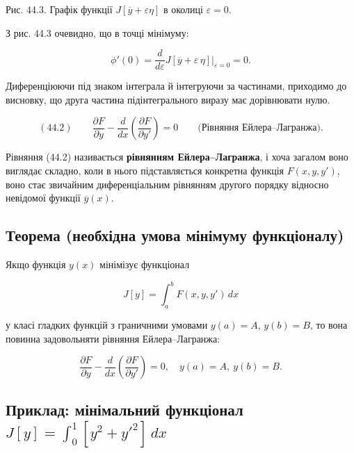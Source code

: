 \documentclass[
  ukrainian,
]{article}
\begin{document}
Рис. 44.3. Графік функції \(J[\overline{y}+\varepsilon\eta]\) в околиці
\(\varepsilon = 0\).

З рис. 44.3 очевидно, що в точці мінімуму:

\[\phi'(0) = \frac{d}{d\varepsilon} J[\overline{y} + \varepsilon\,\eta] \bigg|_{\varepsilon=0} = 0.\]

Диференціюючи під знаком інтеграла й інтегруючи за частинами, приходимо
до висновку, що друга частина підінтегрального виразу має дорівнювати
нулю.

\[(44.2)\qquad\frac{\partial F}{\partial y} - \frac{d}{dx}\!\left(\frac{\partial F}{\partial y'}\right) = 0 \qquad \textbf{(Рівняння Ейлера–Лагранжа)}.\]

Рівняння (44.2) називається \textbf{рівнянням Ейлера--Лагранжа}, і хоча
загалом воно виглядає складно, коли в нього підставляється конкретна
функція \(F(x, y, y')\), воно стає звичайним диференціальним рівнянням
другого порядку відносно невідомої функції \(\overline{y}(x)\).

\subsection{Теорема (необхідна умова мінімуму
функціоналу)}\label{ux442ux435ux43eux440ux435ux43cux430-ux43dux435ux43eux431ux445ux456ux434ux43dux430-ux443ux43cux43eux432ux430-ux43cux456ux43dux456ux43cux443ux43cux443-ux444ux443ux43dux43aux446ux456ux43eux43dux430ux43bux443}

Якщо функція \(y(x)\) мінімізує функціонал

\[J[y] = \int_a^b F(x, y, y')\, dx\]

у класі гладких функцій з граничними умовами \(y(a) = A\), \(y(b) = B\),
то вона повинна задовольняти рівняння Ейлера--Лагранжа:

\[\frac{\partial F}{\partial y} - \frac{d}{dx}\!\left(\frac{\partial F}{\partial y'}\right) = 0, \quad y(a) = A,\ y(b) = B.\]

\subsection{\texorpdfstring{Приклад: мінімальний функціонал
\(J[y] = \int_{0}^{1}[y^2 + y'^2]\,dx\)}{Приклад: мінімальний функціонал J{[}y{]} = \textbackslash int\_\{0\}\^{}\{1\}{[}y\^{}2 + y\textquotesingle\^{}2{]}\textbackslash,dx}}\label{ux43fux440ux438ux43aux43bux430ux434-ux43cux456ux43dux456ux43cux430ux43bux44cux43dux438ux439-ux444ux443ux43dux43aux446ux456ux43eux43dux430ux43b-jy-int_01y2-y2dx}
\end{document}
